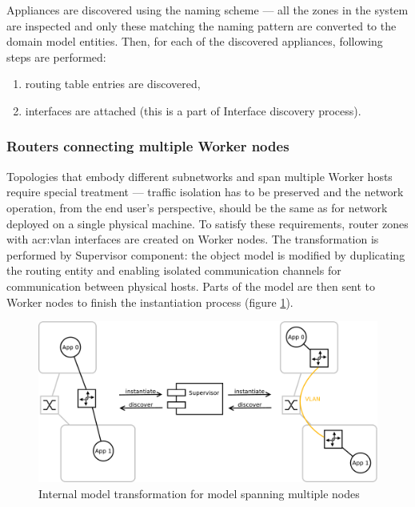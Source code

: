 \documentclass[11pt,openany]{book}
\begin{document}
          Appliances are discovered using the naming scheme --- all the zones in the system are inspected and only these
          matching the naming pattern are converted to the domain model entities. Then, for each of the discovered
          appliances, following steps are performed:

          \begin{enumerate}
            \item routing table entries are discovered,
            \item interfaces are attached (this is a part of Interface discovery process).
          \end{enumerate}


        \subsubsection{Routers connecting multiple Worker nodes}

          Topologies that embody different subnetworks and span multiple Worker hosts require special treatment ---
          traffic isolation has to be preserved and the network operation, from the end user's perspective, should be
          the same as for network deployed on a single physical machine. To satisfy these requirements, router zones
          with \gls{acr:vlan} interfaces are created on Worker nodes. The transformation is performed by Supervisor
          component: the object model is modified by duplicating the routing entity and enabling isolated communication
          channels for communication between physical hosts. Parts of the model are then sent to Worker nodes to finish
          the instantiation process (figure \ref{fig:impl:router}).

          \begin{figure}[h]
            \centering
            \includegraphics[width=.9\textwidth]{img/test-case/router.pdf}

            \caption{Internal model transformation for model spanning multiple nodes}
            \label{fig:impl:router}
          \end{figure}
\end{document}
